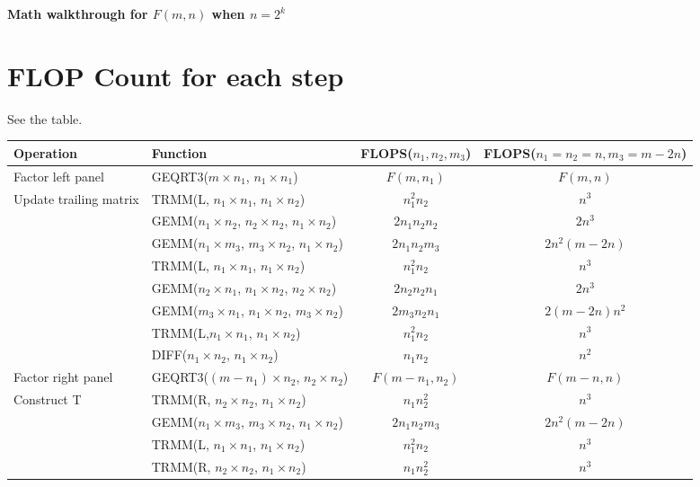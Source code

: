 \documentclass[10pt]{article}
\begin{document}
\noindent\textbf{\Large Math walkthrough for $F(m,n)$ when $n = 2^k$}

\section{FLOP Count for each step}

See the table.

\begin{table}
    \centering
    \label{tab:my_label}
  \begin{tabular}{llcc}
    \toprule
    Operation & Function & FLOPS($n_1,n_2,m_3$) & FLOPS($n_1=n_2=n, m_3=m-2n$)\\
    \midrule
    Factor left panel & GEQRT3($m\times n_1$, $n_1\times n_1$) & $F(m,n_1)$ & $F(m,n)$\\
    \midrule
    Update trailing matrix & TRMM(L, $n_1\times n_1$, $n_1\times n_2$) & $n_1^2n_2$ & $n^3$\\
    & GEMM($n_1\times n_2$, $n_2\times n_2$, $n_1\times n_2$) & $2n_1n_2n_2$ & $2n^3$\\
    & GEMM($n_1\times m_3$, $m_3 \times n_2$, $n_1\times n_2$) & $2n_1n_2m_3$ & $2n^2(m-2n)$\\
    & TRMM(L, $n_1\times n_1$, $n_1\times n_2$) & $n_1^2n_2$ & $n^3$\\
    & GEMM($n_2\times n_1$, $n_1\times n_2$, $n_2\times n_2$) & $2n_2n_2n_1$ & $2n^3$\\
    & GEMM($m_3\times n_1$, $n_1\times n_2$, $m_3\times n_2$) & $2m_3n_2n_1$ & $2(m-2n)n^2$\\
    & TRMM(L,$n_1\times n_1$, $n_1\times n_2$) & $n_1^2n_2$ & $n^3$\\
    & DIFF($n_1\times n_2$, $n_1 \times n_2$) & $n_1n_2$ & $n^2$\\
    \midrule
    Factor right panel & GEQRT3($(m - n_1)\times n_2$, $n_2\times n_2$) &
    $F(m-n_1,n_2)$ & $F(m-n,n)$ \\
    \midrule
    Construct T & TRMM(R, $n_2\times n_2$, $n_1\times n_2$) & $n_1n_2^2$ & $n^3$\\
    & GEMM($n_1\times m_3$, $m_3\times n_2$, $n_1\times n_2$) & $2n_1n_2m_3$ & $2n^2(m-2n)$\\
    & TRMM(L, $n_1\times n_1$, $n_1\times n_2$) & $n_1^2n_2$ & $n^3$\\
    & TRMM(R, $n_2\times n_2$, $n_1\times n_2$) & $n_1n_2^2$ & $n^3$\\
    \bottomrule
  \end{tabular}
\end{table}
\end{document}
